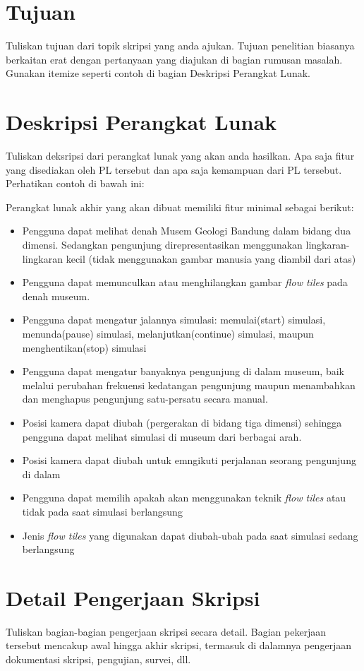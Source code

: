 \documentclass[a4paper,twoside]{article}
\begin{document}
\section{Tujuan}
Tuliskan tujuan dari topik skripsi yang anda ajukan. Tujuan penelitian biasanya berkaitan erat dengan pertanyaan yang diajukan di bagian rumusan masalah. Gunakan itemize seperti contoh di bagian Deskripsi Perangkat Lunak.

\section{Deskripsi Perangkat Lunak}
Tuliskan deksripsi dari perangkat lunak yang akan anda hasilkan. Apa saja fitur yang disediakan oleh PL tersebut dan apa saja kemampuan dari PL tersebut. Perhatikan contoh di bawah ini:

Perangkat lunak akhir yang akan dibuat memiliki fitur minimal sebagai berikut:
\begin{itemize}
	\item Pengguna dapat melihat denah Musem Geologi Bandung dalam bidang dua dimensi. Sedangkan pengunjung direpresentasikan menggunakan lingkaran-lingkaran kecil (tidak menggunakan gambar manusia yang diambil dari atas)
	\item Pengguna dapat memunculkan atau menghilangkan gambar {\it flow tiles} pada denah museum. 
	\item Pengguna dapat mengatur jalannya simulasi: memulai(start) simulasi, menunda(pause) simulasi, melanjutkan(continue) simulasi, maupun menghentikan(stop) simulasi
	\item Pengguna dapat mengatur banyaknya pengunjung di dalam museum, baik melalui perubahan frekuensi kedatangan pengunjung maupun menambahkan dan menghapus pengunjung satu-persatu secara manual.
	\item Posisi kamera dapat diubah (pergerakan di bidang tiga dimensi) sehingga pengguna dapat melihat simulasi di museum dari berbagai arah. 
	\item Posisi kamera dapat diubah untuk emngikuti perjalanan seorang pengunjung di dalam 
	\item Pengguna dapat memilih apakah akan menggunakan teknik {\it flow tiles} atau tidak pada saat simulasi berlangsung
	\item Jenis {\it flow tiles} yang digunakan dapat diubah-ubah pada saat simulasi sedang berlangsung
		
\end{itemize}

\section{Detail Pengerjaan Skripsi}
Tuliskan bagian-bagian pengerjaan skripsi secara detail. Bagian pekerjaan tersebut mencakup awal hingga akhir skripsi, termasuk di dalamnya pengerjaan dokumentasi skripsi, pengujian, survei, dll.
\end{document}
